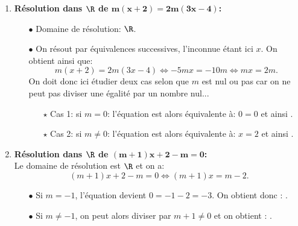 
\begin{correction} \;
\begin{enumerate}
\item \textbf{R\'esolution dans $\mathbf{\R}$ de $\mathbf{m(x+2)=2m(3x-4)}$:}\\
\noindent \begin{itemize}
\item[$\bullet$] Domaine de r\'esolution: $\R$.
\item[$\bullet$] On r\'esout par \'equivalences successives, l'inconnue \'etant ici $x$. On obtient ainsi que:
$$m(x+2)=2m(3x-4)\Leftrightarrow -5mx=-10m\Leftrightarrow mx=2m.$$
On doit donc ici \'etudier deux cas selon que $m$ est nul ou pas car on ne peut pas diviser une \'egalit\'e par un nombre nul...
\begin{itemize}
\item[$\star$] Cas 1: si $m=0$: l'\'equation est alors \'equivalente \`{a}: $0=0$ et ainsi .
\item[$\star$] Cas 2: si $m\not= 0$: l'\'equation est alors \'equivalente \`{a}: $x=2$ et ainsi .
\end{itemize}
\end{itemize}
\item \textbf{R\'esolution dans $\mathbf{\R}$ de $\mathbf{(m+1)x+2-m=0}$:}\\
\noindent Le domaine de r\'esolution est $\R$ et on a: 
$$(m+1)x+2-m=0\Leftrightarrow (m+1)x=m-2.$$
\begin{itemize}
 \item[$\bullet$]  Si $m=-1$, l'\'equation devient $0=-1-2=-3$. On obtient donc : .
\item[$\bullet$]  Si $m\not= -1$, on peut alors diviser par $m+1\not= 0$ et on obtient : .
\end{itemize}

\end{enumerate}
\end{correction}
